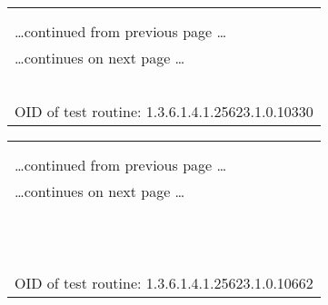 \documentclass{article}
\begin{document}
\begin{longtable}{|p{}|}
\hline
\rowcolor{openvas_log}{\color{white}{Log (CVSS: 0.0) }}\\
\rowcolor{openvas_log}{\color{white}{NVT: Services}}\\
\hline
\endfirsthead
\hfill\ldots continued from previous page \ldots \\
\hline
\endhead
\hline
\ldots continues on next page \ldots \\
\endfoot
\hline
\endlastfoot
\\
\rowcolor{white}{\verb=A web server is running on this port=}\\
\rowcolor{white}{\verb==}\\
\rowcolor{white}{\verb==}\\
\\
OID of test routine: 1.3.6.1.4.1.25623.1.0.10330\\
\end{longtable}

\begin{longtable}{|p{}|}
\hline
\rowcolor{openvas_log}{\color{white}{Log (CVSS: 0.0) }}\\
\rowcolor{openvas_log}{\color{white}{NVT: Web mirroring}}\\
\hline
\endfirsthead
\hfill\ldots continued from previous page \ldots \\
\hline
\endhead
\hline
\ldots continues on next page \ldots \\
\endfoot
\hline
\endlastfoot
\\
\rowcolor{white}{\verb=The following CGI have been discovered :=}\\
\rowcolor{white}{\verb=Syntax : cginame (arguments [default value])=}\\
\rowcolor{white}{\verb=/examples/servlets/servlet/RequestParamExample (firstname [] lastname [] )=}\\
\rowcolor{white}{\verb=/examples/jsp/jsp2/el/implicit-objects.jsp (foo [bar] )=}\\
\rowcolor{white}{\verb=/examples/jsp/jsp2/el/functions.jsp (foo [JSP+2.0] )=}\\
\rowcolor{white}{\verb=/examples/servlets/servlet/CookieExample (cookiename [] cookievalue [] )=}\\
\rowcolor{white}{\verb=/examples/servlets/servlet/SessionExample;jsessionid=\verb-=-\verb=0EF89E75F6776AF767786E3F789=}\\
\rowcolor{white}{$\hookrightarrow$\verb=B7B54 (dataname [] datavalue [] )=}\\
\rowcolor{white}{\verb==}\\
\rowcolor{white}{\verb==}\\
\\
OID of test routine: 1.3.6.1.4.1.25623.1.0.10662\\
\end{longtable}
\end{document}
